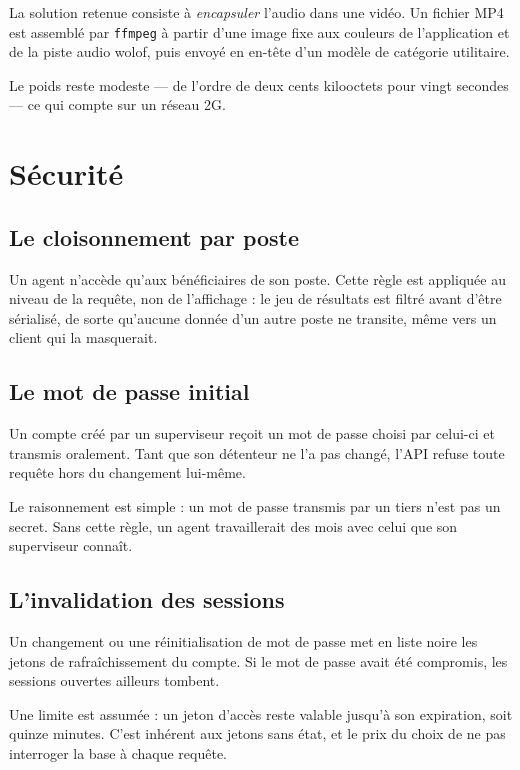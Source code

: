 \documentclass[11pt,a4paper]{report}
\begin{document}
La solution retenue consiste à \emph{encapsuler} l'audio dans une vidéo. Un
fichier MP4 est assemblé par \texttt{ffmpeg} à partir d'une image fixe aux
couleurs de l'application et de la piste audio wolof, puis envoyé en en-tête
d'un modèle de catégorie utilitaire.

Le poids reste modeste — de l'ordre de deux cents kilooctets pour vingt
secondes — ce qui compte sur un réseau 2G.

\section{Sécurité}

\subsection{Le cloisonnement par poste}

Un agent n'accède qu'aux bénéficiaires de son poste. Cette règle est
appliquée au niveau de la requête, non de l'affichage : le jeu de résultats
est filtré avant d'être sérialisé, de sorte qu'aucune donnée d'un autre poste
ne transite, même vers un client qui la masquerait.

\subsection{Le mot de passe initial}

Un compte créé par un superviseur reçoit un mot de passe choisi par celui-ci
et transmis oralement. Tant que son détenteur ne l'a pas changé, l'API refuse
toute requête hors du changement lui-même.

Le raisonnement est simple : un mot de passe transmis par un tiers n'est pas
un secret. Sans cette règle, un agent travaillerait des mois avec celui que
son superviseur connaît.

\subsection{L'invalidation des sessions}

Un changement ou une réinitialisation de mot de passe met en liste noire les
jetons de rafraîchissement du compte. Si le mot de passe avait été compromis,
les sessions ouvertes ailleurs tombent.

Une limite est assumée : un jeton d'accès reste valable jusqu'à son
expiration, soit quinze minutes. C'est inhérent aux jetons sans état, et le
prix du choix de ne pas interroger la base à chaque requête.
\end{document}
